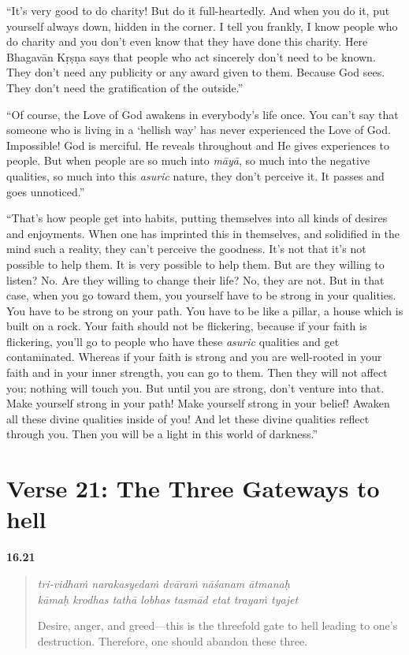 \enquote{It’s very good to do charity! But do it full-heartedly. And when you do it, put yourself always down, hidden in the corner. I tell you frankly, I know people who do charity and you don’t even know that they have done this charity. Here Bhagavān Kṛṣṇa says that people who act sincerely don’t need to be known. They don’t need any publicity or any award given to them. Because God sees. They don’t need the gratification of the outside.}

\enquote{Of course, the Love of God awakens in everybody’s life once. You can’t say that someone who is living in a \enquote{hellish way} has never experienced the Love of God. Impossible! God is merciful. He reveals throughout and He gives experiences to people. But when people are so much into \textit{māyā}, so much into the negative qualities, so much into this \textit{asuric} nature, they don’t perceive it. It passes and goes unnoticed.}

\enquote{That’s how people get into habits, putting themselves into all kinds of desires and enjoyments. When one has imprinted this in themselves, and solidified in the mind such a reality, they can’t perceive the goodness. It’s not that it’s not possible to help them. It is very possible to help them. But are they willing to listen? No. Are they willing to change their life? No, they are not. But in that case, when you go toward them, you yourself have to be strong in your qualities. You have to be strong on your path. You have to be like a pillar, a house which is built on a rock. Your faith should not be flickering, because if your faith is flickering, you’ll go to people who have these \textit{asuric} qualities and get contaminated. Whereas if your faith is strong and you are well-rooted in your faith and in your inner strength, you can go to them. Then they will not affect you; nothing will touch you. But until you are strong, don’t venture into that. Make yourself strong in your path! Make yourself strong in your belief! Awaken all these divine qualities inside of you! And let these divine qualities reflect through you. Then you will be a light in this world of darkness.}

\section{Verse 21: The Three Gateways to hell}\label{sec-verse-21-the-three-gateways-to-hell}


\par\noindent\textbf{16.21}\par
\begin{verse}
\textit{tri-vidhaṁ narakasyedaṁ dvāraṁ nāśanam ātmanaḥ} \\
\textit{kāmaḥ krodhas tathā lobhas tasmād etat trayaṁ tyajet}

\noindent Desire, anger, and greed---this is the threefold gate to hell leading to one's destruction. Therefore, one should abandon these three.
\end{verse}
\par


